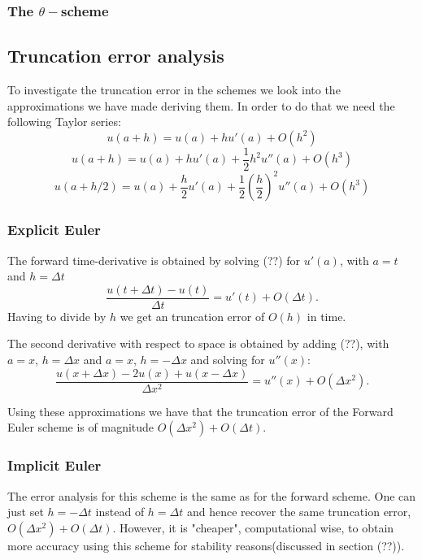 \documentclass[11pt,a4paper,draft]{article}
\numberwithin{equation}{section}
\begin{document}
\subsubsection{The $\theta-$scheme}

\subsection{Truncation error analysis}

To investigate the truncation error in the schemes we look into the approximations we have made deriving them. In order to do that we need the following Taylor series:
\begin{equation}
u(a+h) = u(a) +hu'(a)+O(h^2)
\end{equation}
\begin{equation}
u(a+h) = u(a) +hu'(a)+\frac{1}{2}h^2 u''(a) +O(h^3)
\end{equation}
\begin{equation}
u(a+h/2) = u(a) +\frac{h}{2}u'(a) + \frac{1}{2} \left( \frac{h}{2} \right)^2 u''(a) + O(h^3)
\end{equation}

\subsubsection{Explicit Euler}
The forward time-derivative is obtained by solving (??) for $u'(a)$, with $a=t$ and $h=\Delta t$
\begin{equation}
\frac{u(t+\Delta t)-u(t)}{\Delta t} = u'(t)+O(\Delta t).
\end{equation}  
Having to divide by $h$ we get an truncation error of $O(h)$ in time.

The second derivative with respect to space is obtained by adding (??), with $a=x$,  $h=\Delta x$ and 
$a=x$,  $h= -\Delta x$ and solving for $u''(x)$:
\begin{equation}
\frac{u(x+\Delta x)-2u(x)+u(x-\Delta x)}{\Delta x^2} = u''(x)+O(\Delta x^2).
\end{equation}  

Using these approximations we have that the truncation error of the Forward Euler scheme is of magnitude $O(\Delta x^2)+O(\Delta t)$.  

\subsubsection{Implicit Euler}
The error analysis for this scheme is the same as for the forward scheme. One can just set $h=- \Delta t$
instead of $h=\Delta t$ and hence recover the same truncation error, $O(\Delta x^2)+O(\Delta t)$. However, it is "cheaper", computational wise, to obtain more accuracy using this scheme for stability reasons(discussed in section (??)). 
\end{document}
